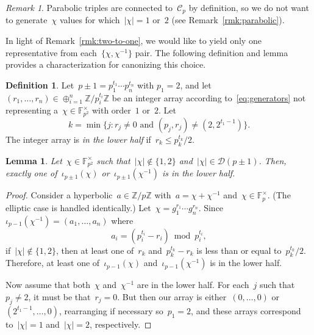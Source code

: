 \documentclass{article}
\newtheorem{lemma}{Lemma}
\theoremstyle{definition}
\newtheorem{definition}{Definition}
\theoremstyle{remark}
\newtheorem{remark}{Remark}
\begin{document}
\begin{remark}
    Parabolic triples are connected to~$\mathcal{C}_p$ by definition, so we do not want to generate~$\chi$ values for which~$|\chi| = 1$ or~$2$ (see Remark~\ref{rmk:parabolic}).
\end{remark}

In light of Remark~\ref{rmk:two-to-one}, we would like to yield only one representative from each~$\{\chi, \chi^{-1}\}$ pair.
The following definition and lemma provides a characterization for canonizing this choice.

\begin{definition}\label{def:lower-half}
    Let~$p \pm 1 = p_1^{t_1} \cdots p_n^{t_n}$ with $p_1 = 2$, and let~$(r_1, \ldots, r_n) \in \oplus_{i=1}^n \mathbb{Z}/p_i^{t_i}\mathbb{Z}$ be an integer array according to~\eqref{eq:generators} not representing a~$\chi \in \mathbb{F}_{p^2}^\times$ with order~$1$ or~$2$.
    Let
    \[ k = \min\{j : r_j \neq 0 \text{\ and } (p_j, r_j) \neq (2, 2^{t_1 - 1})\}. \]
    The integer array is \textit{in the lower half} if~$r_k \leq p_k^{t_k} / 2$.
\end{definition}

\begin{lemma}\label{lem:one-per-half}
    Let~$\chi \in \mathbb{F}_{p^2}^\times$ such that~$|\chi| \not\in \{1, 2\}$ and~$|\chi| \in \mathcal{D}(p \pm 1)$.
    Then, exactly one of~$\iota_{p \pm 1}(\chi)$ or~$\iota_{p \pm 1}(\chi^{-1})$ is in the lower half.
\end{lemma}
\begin{proof}
    Consider a hyperbolic~$a \in \mathbb{Z} / p\mathbb{Z}$ with~$a = \chi + \chi^{-1}$ and~$\chi \in \mathbb{F}_p^\times$.
    (The elliptic case is handled identically.)
    Let~$\chi = g_1^{r_1} \cdots g_n^{r_n}$.
    Since~$\iota_{p - 1}(\chi^{-1}) = (a_1, \ldots, a_n)$ where
    \[ a_i = (p_i^{t_i} - r_i) \bmod p_i^{t_i}, \]
    if~$|\chi| \not\in \{1, 2\}$, then at least one of~$r_k$ and~$p_k^{t_k} - r_k$ is less than or equal to~$p_k^{t_k} / 2$.
    Therefore, at least one of~$\iota_{p - 1}(\chi)$ and~$\iota_{p - 1}(\chi^{-1})$ is in the lower half.

    Now assume that both~$\chi$ and~$\chi^{-1}$ are in the lower half.
    For each~$j$ such that~$p_j \neq 2$, it must be that~$r_j = 0$.
    But then our array is either~$(0,\ldots,0)$ or~$(2^{t_1 - 1},\ldots,0)$, rearranging if necessary so~$p_1 = 2$, and these arrays correspond to~$|\chi| = 1$ and~$|\chi| = 2$, respectively.
\end{proof}
\end{document}
